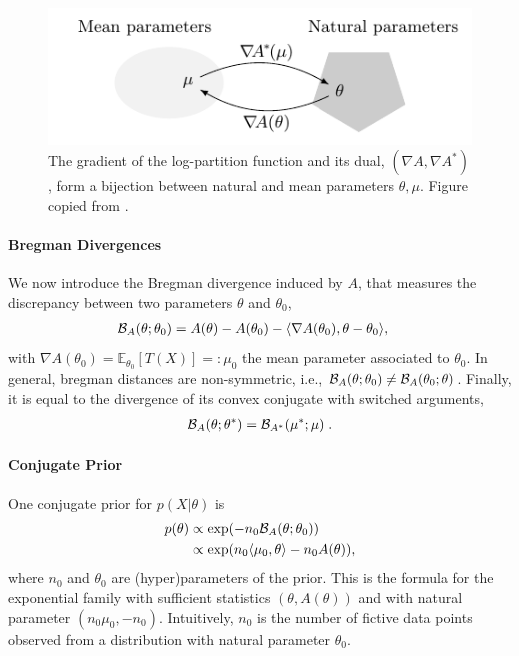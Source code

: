 \documentclass[twoside]{article}
\newcommand*{\expect}[2][]{\ensuremath{\mathbb{E}_{#1} \left[ #2 \right] }} %
\newcommand{\logpart}{A}
\newcommand{\conj}{\logpart^*}
\newcommand{\bregman}{\cB_\logpart}
\newcommand{\bregmanconj}{\cB_{\logpart^*}}
\newcommand{\nat}{\theta}
\newcommand{\m}{\mu}
\newcommand{\meanp}{\m}
\begin{document}
\begin{figure}[t] 
	\centering
	\includegraphics{duality}
	\caption{The gradient of the log-partition function and its dual, $(\nabla \logpart, \nabla \conj)$, form a bijection between natural and mean parameters $\nat, \meanp$. Figure copied from \citet{kunstner2020homeomorphic}. %
	}
	\label{fig:duality}
\end{figure}

\paragraph{Bregman Divergences} %
We now introduce the Bregman divergence induced by $\logpart$, that measures the discrepancy between two parameters $\nat$ and $\nat_0$,
\begin{align}
    \bregman (\nat ; \nat_0)
    & = \logpart(\nat) - \logpart(\nat_0)
    - \langle \nabla \logpart(\nat_0)  , \nat - \nat_0 \rangle,
    \label{eq:defBregman}
\end{align}
with $\nabla \logpart(\nat_0) = \expect[\nat_0]{T(X)} =: \meanp_0$ the mean parameter associated to $\nat_0$. In general, bregman distances are non-symmetric, i.e., $\bregman (\nat ; \nat_0)\neq \bregman (\nat_0 ; \nat)$. Finally, it is equal to the divergence of its convex conjugate with switched arguments,
\begin{align}
	\bregman (\nat ; \nat^*)
    = \bregmanconj ( \meanp^* ; \meanp) \; .
    \label{eq:bregman_switch}
\end{align}

\paragraph{Conjugate Prior}
One conjugate prior \citep{agarwal2010geometric} for $p(X|\nat)$ is
\begin{align}
    p(\nat)
    &\propto \exp( - n_0 \bregman(\nat ; \nat_0) ) \\
    &\propto \exp(n_0 \langle \m_0, \nat \rangle - n_0 \logpart(\nat)),
    \label{eq:def_prior}
\end{align}
where $n_0$ and $\nat_0$ are (hyper)parameters of the prior.
This is the formula for the exponential family with sufficient statistics $(\nat ,\logpart(\nat))$ and with natural parameter $(n_0 \m_0, -n_0)$.
Intuitively, $n_0$ is the number of fictive data points observed from a distribution with natural parameter $\nat_0$.
\end{document}
